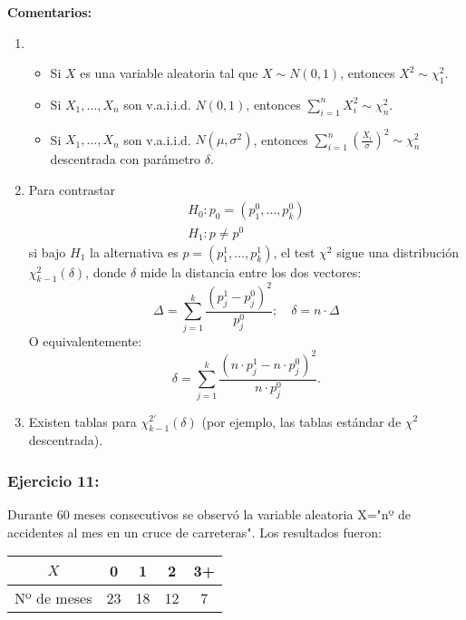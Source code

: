 \textbf{Comentarios:} %
\begin{enumerate}
    \item   \begin{itemize}
        \item Si $X$ es una variable aleatoria tal que $X \sim N(0,1)$, entonces $X^2 \sim \chi^2_1$.
        \item Si $X_1, \dots, X_n$ son v.a.i.i.d. $N(0,1)$, entonces $\sum_{i=1}^{n} X_i^2 \sim \chi^2_n$.
        \item Si $X_1, \dots, X_n$ son v.a.i.i.d. $N(\mu, \sigma^2)$, entonces 
        $
        \sum_{i=1}^{n} \left( \frac{X_i}{\sigma} \right)^2 \sim \chi^2_n
        $
        descentrada con parámetro $\delta$.
    \end{itemize}
    \item Para contrastar 
    \[
    \begin{matrix}
        H_0: p_0 = (p_1^0, \dots, p_k^0) \\
        H_1: p \neq p^0
    \end{matrix}
    \]
    si bajo $H_1$ la alternativa 
    es $p = (p_1^1, \dots, p_k^1)$, el test $\chi^2$ sigue 
    una distribución $\chi^2_{k-1}(\delta)$, donde $\delta$ 
    mide la distancia entre los dos vectores:
    \[
    \Delta = \sum_{j=1}^{k} \frac{(p_j^1 - p_j^0)^2}{p_j^0}; \quad \delta = n \cdot \Delta
    \]
    O equivalentemente:
    \[
    \delta = \sum_{j=1}^{k} \frac{\left( n \cdot p_j^1 - n \cdot p_j^0 \right)^2}{n \cdot p_j^0}.
    \]
    \item Existen tablas para $\chi_{k-1}^{2'}(\delta)$ (por ejemplo, las tablas estándar de $\chi^2$ descentrada).
\end{enumerate}

\newpage

\subsubsection*{Ejercicio 11:}  
Durante 60 meses consecutivos se observó la variable aleatoria X="nº de accidentes al mes en un cruce de carreteras". Los resultados fueron:

\begin{table}[!h]
    \centering
    \begin{tabular}{|c|c|c|c|c|}
        \hline
        {$X$} & 0 & 1 & 2 & 3+ \\ \hline
        {Nº de meses} & 23 & 18 & 12 & 7 \\ \hline
    \end{tabular}
\end{table}

